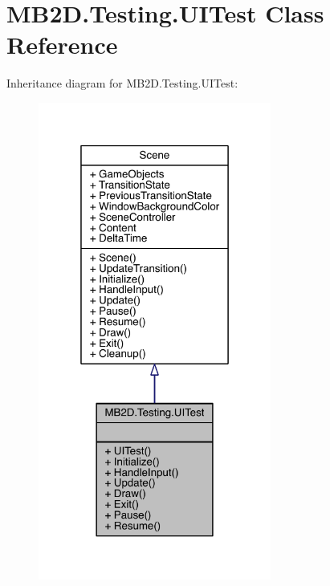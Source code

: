 \hypertarget{class_m_b2_d_1_1_testing_1_1_u_i_test}{}\section{M\+B2\+D.\+Testing.\+U\+I\+Test Class Reference}
\label{class_m_b2_d_1_1_testing_1_1_u_i_test}


Inheritance diagram for M\+B2\+D.\+Testing.\+U\+I\+Test\+:
\nopagebreak
\begin{figure}[H]
\begin{center}
\leavevmode
\includegraphics[width=217pt]{class_m_b2_d_1_1_testing_1_1_u_i_test__inherit__graph}
\end{center}
\end{figure}


